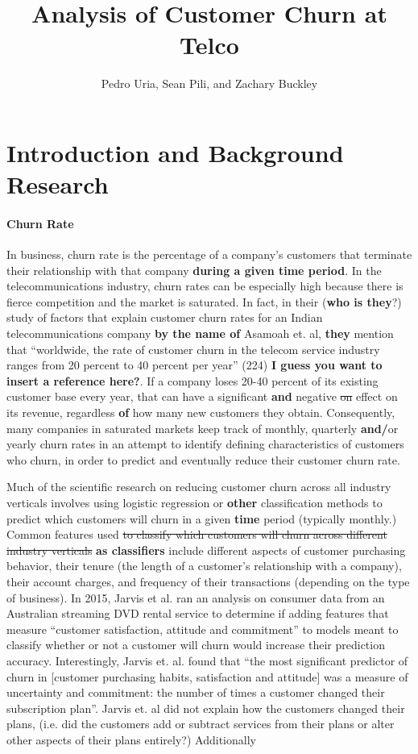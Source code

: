 \documentclass[man, floatsintext]{apa6}
\title{Analysis of Customer Churn at Telco}
\author{Pedro Uria, Sean Pili, and Zachary Buckley}
\affiliation{George Washington University}
\begin{document}
\maketitle

\section{Introduction and Background Research}
\paragraph{Churn Rate}

In business, churn rate is the percentage of a company's customers that terminate their relationship with that company \textbf{during a given time period}. In the telecommunications industry, churn rates can be especially high because there is fierce competition and the market is saturated. In fact, in their (\textbf{who is they}?) study of factors that explain customer churn rates for an Indian telecommunications company \textbf{by the name of} Asamoah et. al, \textbf{they} mention that ``worldwide, the rate of customer churn in the telecom service industry ranges from 20 percent to 40 percent per year'' (224) \textbf{I guess you want to insert a reference here?}. If a company loses 20-40 percent of its existing customer base every year, that can have a significant \textbf{and} negative \sout{on} effect on its revenue, regardless \textbf{of} how many new customers they obtain.  Consequently, many companies in saturated markets keep track of monthly, quarterly \textbf{and/}or yearly churn rates in an attempt to identify defining characteristics of customers who churn, in order to predict and eventually reduce their customer churn rate. 

Much of the scientific research on reducing customer churn across all industry verticals involves using logistic regression or \textbf{other} classification methods to predict which customers will churn in a given \textbf{time} period (typically monthly.) Common features used \sout{to classify which customers will churn across different industry verticals} \textbf{as classifiers} include different aspects of customer purchasing behavior, their tenure (the length of a customer's relationship with a company), their account charges,  and frequency of their transactions (depending on the type of business). In 2015, Jarvis et al. ran an analysis on consumer data from an Australian streaming DVD rental service to determine if adding features that measure ``customer satisfaction, attitude and commitment'' to models meant to classify whether or not a customer will churn would increase their prediction accuracy.  Interestingly, Jarvis et. al. found that ``the most significant predictor of churn in [customer purchasing habits, satisfaction and attitude] was a measure of uncertainty and commitment: the number of times a customer changed their subscription plan''. Jarvis et. al did not explain how the customers changed their plans, (i.e. did the customers add or subtract services from their plans or alter other aspects of their plans entirely?)  Additionally
\end{document}
